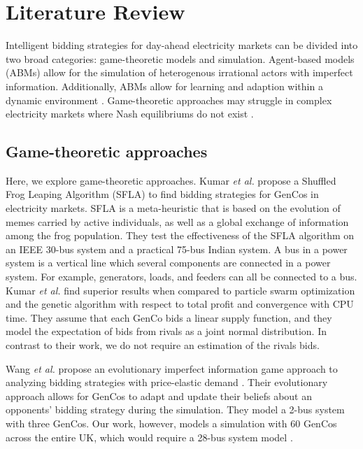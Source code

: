 \documentclass[conference]{IEEEtran}
\begin{document}




\section{Literature Review}
\label{sec:lit-review}

Intelligent bidding strategies for day-ahead electricity markets can be divided into two broad categories: game-theoretic models and simulation. Agent-based models (ABMs) allow for the simulation of heterogenous irrational actors with imperfect information. Additionally, ABMs allow for learning and adaption within a dynamic environment \cite{EsmaeiliAliabadi2017}. Game-theoretic approaches may struggle in complex electricity markets where Nash equilibriums do not exist \cite{Wang2011}.

\subsection{Game-theoretic approaches}

Here, we explore game-theoretic approaches. Kumar \textit{et al.} propose a Shuffled Frog Leaping Algorithm (SFLA) \cite{VijayaKumar2014} to find bidding strategies for GenCos in electricity markets. SFLA is a meta-heuristic that is based on the evolution of memes carried by active individuals, as well as a global exchange of information among the frog population. They test the effectiveness of the SFLA algorithm on an IEEE 30-bus system and a practical 75-bus Indian system. A bus in a power system is a vertical line which several components are connected in a power system. For example, generators, loads, and feeders can all be connected to a bus. Kumar \textit{et al.} find superior results when compared to particle swarm optimization and the genetic algorithm with respect to total profit and convergence with CPU time. They assume that each GenCo bids a linear supply function, and they model the expectation of bids from rivals as a joint normal distribution. In contrast to their work, we do not require an estimation of the rivals bids.

Wang \textit{et al.} propose an evolutionary imperfect information game approach to analyzing bidding strategies with price-elastic demand \cite{Wang2011}. Their evolutionary approach allows for GenCos to adapt and update their beliefs about an opponents' bidding strategy during the simulation. They model a 2-bus system with three GenCos. Our work, however, models a simulation with 60 GenCos across the entire UK, which would require a 28-bus system model \cite{Bell2010}. 
\end{document}
